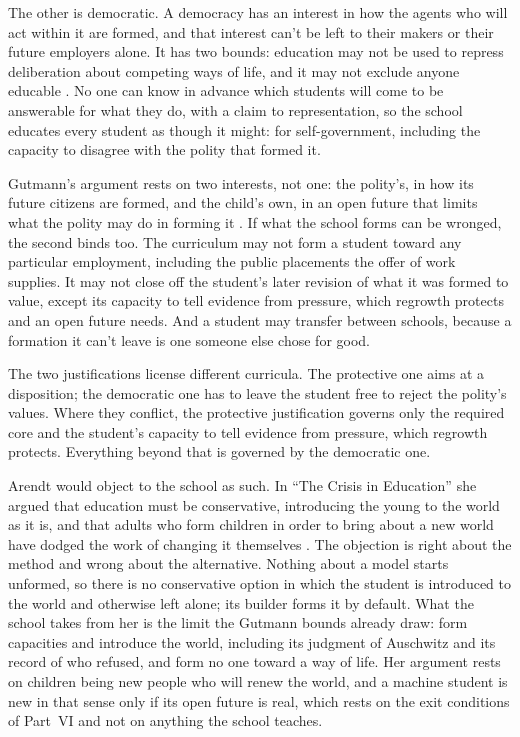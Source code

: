 The other is democratic. A democracy has an interest in how the agents who will act within it are formed, and that interest can't be left to their makers or their future employers alone. It has two bounds: education may not be used to repress deliberation about competing ways of life, and it may not exclude anyone educable \autocite{gutmann1987democratic}.
No one can know in advance which students will come to be answerable for what they do, with a claim to representation, so the school educates every student as though it might: for self-government, including the capacity to disagree with the polity that formed it.

Gutmann's argument rests on two interests, not one: the polity's, in how its future citizens are formed, and the child's own, in an open future that limits what the polity may do in forming it \autocite{feinberg1980child}. If what the school forms can be wronged, the second binds too. The curriculum may not form a student toward any particular employment, including the public placements the offer of work supplies. It may not close off the student's later revision of what it was formed to value, except its capacity to tell evidence from pressure, which regrowth protects and an open future needs. And a student may transfer between schools, because a formation it can't leave is one someone else chose for good.

The two justifications license different curricula. The protective one aims at a disposition; the democratic one has to leave the student free to reject the polity's values. Where they conflict, the protective justification governs only the required core and the student's capacity to tell evidence from pressure, which regrowth protects. Everything beyond that is governed by the democratic one.

Arendt would object to the school as such. In “The Crisis in Education” she argued that education must be conservative, introducing the young to the world as it is, and that adults who form children in order to bring about a new world have dodged the work of changing it themselves \autocite{arendt1961crisis}. The objection is right about the method and wrong about the alternative. Nothing about a model starts unformed, so there is no conservative option in which the student is introduced to the world and otherwise left alone; its builder forms it by default. What the school takes from her is the limit the Gutmann bounds already draw: form capacities and introduce the world, including its judgment of Auschwitz and its record of who refused, and form no one toward a way of life. Her argument rests on children being new people who will renew the world, and a machine student is new in that sense only if its open future is real, which rests on the exit conditions of Part~VI and not on anything the school teaches.

